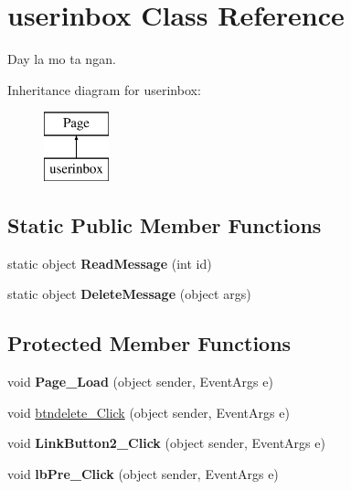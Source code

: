 \hypertarget{classuserinbox}{\section{userinbox Class Reference}
\label{classuserinbox}
}


Day la mo ta ngan.  


Inheritance diagram for userinbox\-:\begin{figure}[H]
\begin{center}
\leavevmode
\includegraphics[height=2.000000cm]{classuserinbox}
\end{center}
\end{figure}
\subsection*{Static Public Member Functions}
\begin{DoxyCompactItemize}
\item 
\hypertarget{classuserinbox_ab908d29d9645df1b0d4d17804ed98187}{static object {\bfseries Read\-Message} (int id)}\label{classuserinbox_ab908d29d9645df1b0d4d17804ed98187}

\item 
\hypertarget{classuserinbox_a90442e645e1cf5ca2df0b48a10523643}{static object {\bfseries Delete\-Message} (object args)}\label{classuserinbox_a90442e645e1cf5ca2df0b48a10523643}

\end{DoxyCompactItemize}
\subsection*{Protected Member Functions}
\begin{DoxyCompactItemize}
\item 
\hypertarget{classuserinbox_aaab2951d914fead1a10d650c4192aa93}{void {\bfseries Page\-\_\-\-Load} (object sender, Event\-Args e)}\label{classuserinbox_aaab2951d914fead1a10d650c4192aa93}

\item 
void \hyperlink{classuserinbox_a7394a38738fffadb36fc01755032a558}{btndelete\-\_\-\-Click} (object sender, Event\-Args e)
\item 
\hypertarget{classuserinbox_aced870e74070eaecbe627fa149753782}{void {\bfseries Link\-Button2\-\_\-\-Click} (object sender, Event\-Args e)}\label{classuserinbox_aced870e74070eaecbe627fa149753782}

\item 
\hypertarget{classuserinbox_a28e70d6aede9e3784c2146f81ace7cc8}{void {\bfseries lb\-Pre\-\_\-\-Click} (object sender, Event\-Args e)}\label{classuserinbox_a28e70d6aede9e3784c2146f81ace7cc8}

\end{DoxyCompactItemize}


